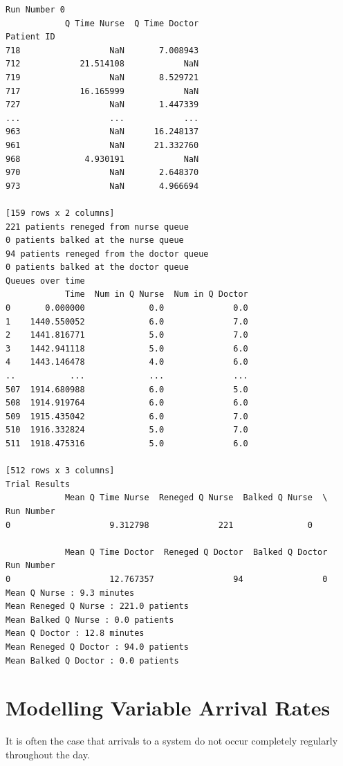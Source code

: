 \documentclass[
  letterpaper,
  DIV=11,
  numbers=noendperiod]{scrreprt}
\begin{document}
\begin{verbatim}
Run Number 0
            Q Time Nurse  Q Time Doctor
Patient ID                             
718                  NaN       7.008943
712            21.514108            NaN
719                  NaN       8.529721
717            16.165999            NaN
727                  NaN       1.447339
...                  ...            ...
963                  NaN      16.248137
961                  NaN      21.332760
968             4.930191            NaN
970                  NaN       2.648370
973                  NaN       4.966694

[159 rows x 2 columns]
221 patients reneged from nurse queue
0 patients balked at the nurse queue
94 patients reneged from the doctor queue
0 patients balked at the doctor queue
Queues over time
            Time  Num in Q Nurse  Num in Q Doctor
0       0.000000             0.0              0.0
1    1440.550052             6.0              7.0
2    1441.816771             5.0              7.0
3    1442.941118             5.0              6.0
4    1443.146478             4.0              6.0
..           ...             ...              ...
507  1914.680988             6.0              5.0
508  1914.919764             6.0              6.0
509  1915.435042             6.0              7.0
510  1916.332824             5.0              7.0
511  1918.475316             5.0              6.0

[512 rows x 3 columns]
Trial Results
            Mean Q Time Nurse  Reneged Q Nurse  Balked Q Nurse  \
Run Number                                                       
0                    9.312798              221               0   

            Mean Q Time Doctor  Reneged Q Doctor  Balked Q Doctor  
Run Number                                                         
0                    12.767357                94                0  
Mean Q Nurse : 9.3 minutes
Mean Reneged Q Nurse : 221.0 patients
Mean Balked Q Nurse : 0.0 patients
Mean Q Doctor : 12.8 minutes
Mean Reneged Q Doctor : 94.0 patients
Mean Balked Q Doctor : 0.0 patients
\end{verbatim}

\chapter{Modelling Variable Arrival
Rates}\label{modelling-variable-arrival-rates}

It is often the case that arrivals to a system do not occur completely
regularly throughout the day.
\end{document}
